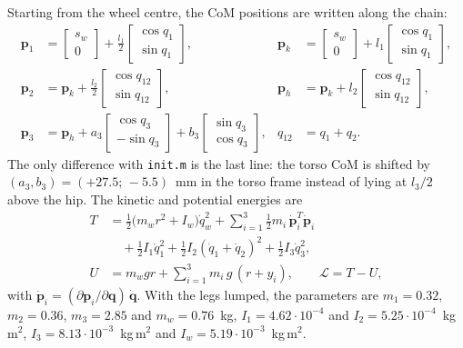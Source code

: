 \documentclass[11pt,a4paper]{article}
\newcommand{\bq}{\bm{q}}
\newcommand{\bdq}{\dot{\bm{q}}}
\begin{document}
Starting from the wheel centre, the CoM positions are written along the chain:
\begin{align}
    \bm{p}_1 &= \begin{bmatrix} s_w\\0\end{bmatrix} + \tfrac{l_1}{2}\begin{bmatrix}\cos q_1\\ \sin q_1\end{bmatrix}, &
    \bm{p}_k &= \begin{bmatrix} s_w\\0\end{bmatrix} + l_1\begin{bmatrix}\cos q_1\\ \sin q_1\end{bmatrix},\\
    \bm{p}_2 &= \bm{p}_k + \tfrac{l_2}{2}\begin{bmatrix}\cos q_{12}\\ \sin q_{12}\end{bmatrix}, &
    \bm{p}_h &= \bm{p}_k + l_2\begin{bmatrix}\cos q_{12}\\ \sin q_{12}\end{bmatrix},\\
    \bm{p}_3 &= \bm{p}_h + a_3\begin{bmatrix}\cos q_3\\ -\sin q_3\end{bmatrix} + b_3\begin{bmatrix}\sin q_3\\ \cos q_3\end{bmatrix}, &
    q_{12} &= q_1 + q_2 .
\end{align}
The only difference with \texttt{init.m} is the last line: the torso CoM is shifted by
$(a_3, b_3) = (+27.5;\,-5.5)$~mm in the torso frame instead of lying at $l_3/2$ above the hip.
The kinetic and potential energies are
\begin{align}
    T &= \tfrac12\big(m_w r^2 + I_w\big)\dot q_w^2 + \sum_{i=1}^{3}\tfrac12 m_i\,\dot{\bm p}_i^T\dot{\bm p}_i\nonumber\\
      &\quad + \tfrac12 I_1\dot q_1^2 + \tfrac12 I_2(\dot q_1+\dot q_2)^2 + \tfrac12 I_3\dot q_3^2,\\
    U &= m_w g r + \sum_{i=1}^{3} m_i\,g\,(r + y_i), \qquad \mathcal{L} = T - U,
\end{align}
with $\dot{\bm p}_i = (\partial\bm p_i/\partial\bq)\,\bdq$.  With the legs lumped, the parameters
are $m_1 = 0.32$, $m_2 = 0.36$, $m_3 = 2.85$ and $m_w = 0.76$~kg,
$I_1 = 4.62\cdot10^{-4}$ and $I_2 = 5.25\cdot10^{-4}$~kg\,m$^2$, $I_3 = 8.13\cdot10^{-3}$~kg\,m$^2$ and
$I_w = 5.19\cdot10^{-3}$~kg\,m$^2$.
\end{document}
